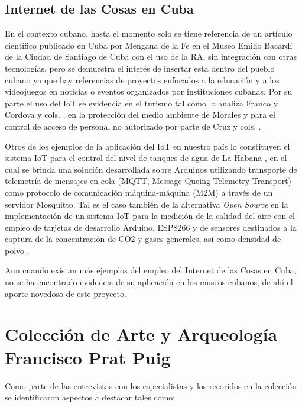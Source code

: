     \subsection{Internet de las Cosas en Cuba}\label{sec:iotCuba} 

    En el contexto cubano, hasta el momento solo se tiene referencia de un artículo científico publicado en Cuba por Mengana de la Fe \cite{lopezramos} en el Museo Emilio Bacardí de la Ciudad de Santiago de Cuba con el uso de la RA,
    sin integración con otras tecnologías, pero se demuestra el interés de insertar esta dentro del pueblo cubano ya que hay referencias de proyectos enfocados a la educación y a los videojuegos en noticias o eventos organizados por instituciones cubanas.
    Por su parte el uso del IoT se evidencia en el turismo tal como lo analiza Franco \cite{franco} y Cordova y cols. \cite{cordovacorso}, en la protección del medio ambiente de Morales \cite{morales} y para el control de acceso de personal no autorizado por parte de Cruz y cols. \cite{cruzrojas}.

    Otros de los ejemplos de la aplicación del IoT en nuestro país lo constituyen el sistema IoT para el control del nivel de tanques de agua de La Habana \cite{herrera2020}, en el cual se brinda una solución desarrollada sobre Arduinos utilizando transporte de telemetría de mensajes en cola (MQTT, Message Queing Telemetry Transport)
    como protocolo de comunicación máquina-máquina (M2M) a través de un servidor Mosquitto. Tal es el caso también de la alternativa \textit{Open Source} en la implementación de un sistema IoT para la medición de la calidad del aire con el empleo de tarjetas de desarrollo Arduino, ESP8266 y de sensores destinados a la captura de la concentración de CO2 y gases generales, así como densidad de polvo \cite{ochoa2018alternativa}.
    
    Aun cuando existan más ejemplos del empleo del Internet de las Cosas en Cuba, no se ha encontrado evidencia de su aplicación en los museos cubanos, de ahí el aporte novedoso de este proyecto.

    \section{Colección de Arte y Arqueología Francisco Prat Puig}

    Como parte de las entrevistas con los especialistas y los recoridos en la colección se identificaron aspectos a destacar tales como:

